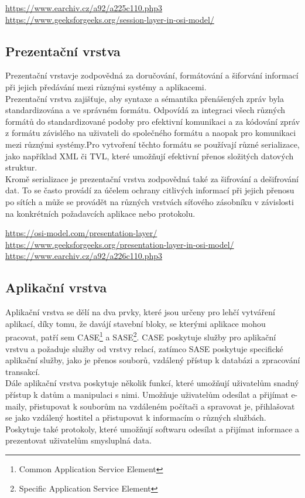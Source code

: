\documentclass[12pt]{report}			%
\begin{document}
\url{https://www.earchiv.cz/a92/a225c110.php3}
\url{https://www.geeksforgeeks.org/session-layer-in-osi-model/}
				\subsection{Prezentační vrstva}
Prezentační vrstavje zodpovědná za doručování, formátování a šiforvání informací při jejich předávání mezi různými systémy a aplikacemi.
\\
Prezentační vrstva zajišťuje, aby syntaxe a sémantika přenášených zpráv byla standardizována a ve správném formátu. Odpovídá za integraci všech různých formátů do standardizované podoby pro efektivní komunikaci a za kódování zpráv z formátu závislého na uživateli do společného formátu a naopak pro komunikaci mezi různými systémy.Pro vytvoření těchto formátu se používají různé serializace, jako například XML či TVL, které umožňují efektivní přenos složitých datových struktur. 
\\
Kromě serializace je prezentační vrstva zodpovědná také za šifrování a dešifrování dat. To se často provádí za účelem ochrany citlivých informací při jejich přenosu po sítích a může se provádět na různých vrstvách síťového zásobníku v závislosti na konkrétních požadavcích aplikace nebo protokolu.

\url{https://osi-model.com/presentation-layer/}
\url{https://www.geeksforgeeks.org/presentation-layer-in-osi-model/}
\url{https://www.earchiv.cz/a92/a226c110.php3}

				\subsection{Aplikační vrstva}
Aplikační vrstva se dělí na dva prvky, které jsou určeny pro lehčí vytváření aplikací, díky tomu, že davájí stavební bloky, se kterými aplikace mohou pracovat, patří sem CASE\footnote{Common Application Service Element} a SASE\footnote{Specific Application Service Element}. CASE poskytuje služby pro aplikační vrstvu a požaduje služby od vrstvy relací, zatímco SASE poskytuje specifické aplikační služby, jako je přenos souborů, vzdálený přístup k databázi a zpracování transakcí.
\\
Dále aplikační vrstva poskytuje několik funkcí, které umožňují uživatelům snadný přístup k datům a manipulaci s nimi. Umožňuje uživatelům odesílat a přijímat e-maily, přistupovat k souborům na vzdáleném počítači a spravovat je, přihlašovat se jako vzdálený hostitel a přistupovat k informacím o různých službách. Poskytuje také protokoly, které umožňují softwaru odesílat a přijímat informace a prezentovat uživatelům smysluplná data.
\end{document}
